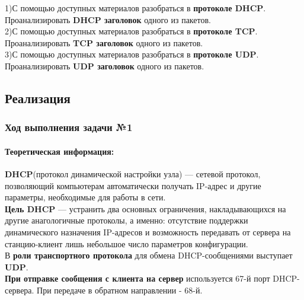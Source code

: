1)С помощью доступных материалов разобраться в \textbf{протоколе DHCP}. Проанализировать \textbf{DHCP заголовок} одного из пакетов.\\
2)С помощью доступных материалов разобраться в \textbf{протоколе TCP}. Проанализировать \textbf{TCP заголовок} одного из пакетов.\\
3)С помощью доступных материалов разобраться в \textbf{протоколе UDP}. Проанализировать \textbf{UDP заголовок} одного из пакетов.

\subsection{Реализация}

\subsubsection{Ход выполнения задачи №1}

\paragraph{Теоретическая информация:\cite{DHCP}\\}

\textbf{DHCP}(протокол динамической настройки узла) — сетевой протокол, позволяющий компьютерам автоматически получать IP-адрес и другие параметры, необходимые для работы в сети.\\


\textbf{Цель DHCP} — устранить два основных ограничения, накладывающихся на другие анагологичные протоколы, а именно: отсутствие поддержки динамического назначения IP-адресов и возможность передавать от сервера на станцию-клиент лишь небольшое число параметров конфигурации.\\


В \textbf{роли транспортного протокола} для обмена DHCP-сообщениями выступает \textbf{UDP}.\\


\textbf{При отправке сообщения с клиента на сервер} используется 67-й порт DHCP-сервера. При передаче в обратном направлении - 68-й.\\


